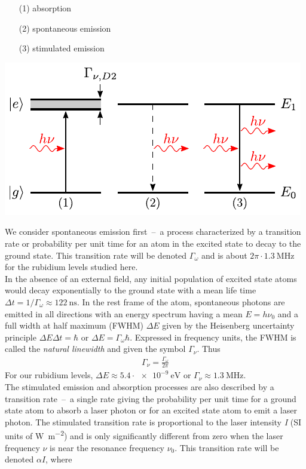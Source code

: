 \begin{minipage}[c][][c]{.35\textwidth}
\begin{itemize}
\item[(1)] absorption
\item[(2)] spontaneous emission
\item[(3)] stimulated emission
\end{itemize}
\end{minipage}
\hfill
\begin{minipage}[c]{.55\textwidth}
\includegraphics[width=\textwidth]{twolevel}
\end{minipage}
\bigskip

We consider spontaneous emission first~--~a process characterized by a transition rate or probability
per unit time for an atom in the excited state to decay to the ground state. This transition rate will 
be denoted \(\Gamma_\omega \) and is about \(2\pi\cdot \SI{1.3}{\mega\hertz} \) for the rubidium levels
studied here. \\
In the absence of an external field, any initial population of excited state atoms would decay exponentially
to the ground state with a mean life time \(\Delta t = 1/\Gamma_\omega \approx \SI{122}{\nano\second} \).
In the rest frame of the atom, spontaneous photons are emitted in all directions with an energy spectrum
having a mean \(E=h\nu_0 \) and a full width at half maximum (FWHM) \(\Delta E \) given by the
Heisenberg uncertainty principle \(\Delta E \Delta t = \hbar \) or \(\Delta E = \Gamma_\omega\hbar \).
Expressed in frequency units, the FWHM is called the \textit{natural linewidth} and given the symbol
\(\Gamma_\nu \). Thus
\begin{align}\label{eq:gamma_relation}
    \Gamma_\nu = \frac{\Gamma_\omega}{2\pi}
\end{align}
For our rubidium levels, \(\Delta E \approx 5.4\cdot \SI{e-9}{\electronvolt} \) or \(\Gamma_\nu\approx \SI{1.3}{\mega\hertz} \). \\ 
The stimulated emission and absorption processes are also described by a transition rate~--~a single rate
giving the probability per unit time for a ground state atom to absorb a laser photon or for an excited
state atom to emit a laser photon. The stimulated transition rate is proportional to the laser intensity
\textit{I} (SI units of \si{\watt\per\meter\squared}) and is only significantly different from zero when
the laser frequency \(\nu \) is near the resonance frequency \(\nu_0 \). This transition rate will be denoted
\(\alpha I \), where 

